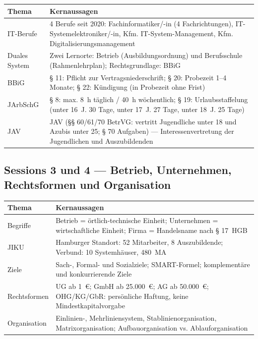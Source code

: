 \documentclass[11pt, a4paper]{article}
\begin{document}
\begin{center}
\begin{tabular}{p{3cm} p{10.5cm}}
\toprule
\textbf{Thema} & \textbf{Kernaussagen}\\
\midrule
IT-Berufe & 4 Berufe seit 2020: Fachinformatiker/-in (4 Fachrichtungen), IT-Systemelektroniker/-in,
            Kfm. IT-System-Management, Kfm. Digitalisierungsmanagement\\
\addlinespace
Duales System & Zwei Lernorte: Betrieb (Ausbildungsordnung) und Berufsschule (Rahmenlehrplan);
                Rechtsgrundlage: BBiG\\
\addlinespace
BBiG & § 11: Pflicht zur Vertragsniederschrift; § 20: Probezeit 1--4 Monate;
       § 22: Kündigung (in Probezeit ohne Frist)\\
\addlinespace
JArbSchG & § 8: max. 8~h täglich / 40~h wöchentlich; § 19: Urlaubsstaffelung
           (unter 16~J. 30 Tage, unter 17~J. 27 Tage, unter 18~J. 25 Tage)\\
\addlinespace
JAV & JAV (§§ 60/61/70 BetrVG: vertritt Jugendliche unter 18 und Azubis unter 25; § 70 Aufgaben) --- Interessenvertretung der Jugendlichen und Auszubildenden\\
\bottomrule
\end{tabular}
\end{center}

\subsection{Sessions 3 und 4 --- Betrieb, Unternehmen, Rechtsformen und Organisation}

\begin{center}
\begin{tabular}{p{3cm} p{10.5cm}}
\toprule
\textbf{Thema} & \textbf{Kernaussagen}\\
\midrule
Begriffe & Betrieb = örtlich-technische Einheit; Unternehmen = wirtschaftliche Einheit;
           Firma = Handelsname nach § 17~HGB\\
\addlinespace
JIKU & Hamburger Standort: 52 Mitarbeiter, 8 Auszubildende; Verbund: 10 Systemhäuser, 480~MA\\
\addlinespace
Ziele & Sach-, Formal- und Sozialziele; SMART-Formel; komplementäre und konkurrierende Ziele\\
\addlinespace
Rechtsformen & UG ab 1~€; GmbH ab 25.000~€; AG ab 50.000~€;
               OHG/KG/GbR: persönliche Haftung, keine Mindestkapitalvorgabe\\
\addlinespace
Organisation & Einlinien-, Mehrliniensystem, Stablinienorganisation, Matrixorganisation;
               Aufbauorganisation vs. Ablauforganisation\\
\bottomrule
\end{tabular}
\end{center}
\end{document}
